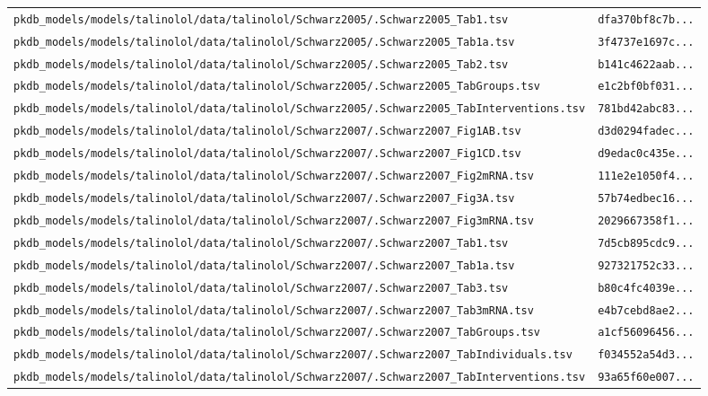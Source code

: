 \documentclass{article}
\begin{document}
\begin{longtable}{ll}
\texttt{pkdb\_models/models/talinolol/data/talinolol/Schwarz2005/.Schwarz2005\_Tab1.tsv} & \texttt{dfa370bf8c7b...} \\
\texttt{pkdb\_models/models/talinolol/data/talinolol/Schwarz2005/.Schwarz2005\_Tab1a.tsv} & \texttt{3f4737e1697c...} \\
\texttt{pkdb\_models/models/talinolol/data/talinolol/Schwarz2005/.Schwarz2005\_Tab2.tsv} & \texttt{b141c4622aab...} \\
\texttt{pkdb\_models/models/talinolol/data/talinolol/Schwarz2005/.Schwarz2005\_TabGroups.tsv} & \texttt{e1c2bf0bf031...} \\
\texttt{pkdb\_models/models/talinolol/data/talinolol/Schwarz2005/.Schwarz2005\_TabInterventions.tsv} & \texttt{781bd42abc83...} \\
\texttt{pkdb\_models/models/talinolol/data/talinolol/Schwarz2007/.Schwarz2007\_Fig1AB.tsv} & \texttt{d3d0294fadec...} \\
\texttt{pkdb\_models/models/talinolol/data/talinolol/Schwarz2007/.Schwarz2007\_Fig1CD.tsv} & \texttt{d9edac0c435e...} \\
\texttt{pkdb\_models/models/talinolol/data/talinolol/Schwarz2007/.Schwarz2007\_Fig2mRNA.tsv} & \texttt{111e2e1050f4...} \\
\texttt{pkdb\_models/models/talinolol/data/talinolol/Schwarz2007/.Schwarz2007\_Fig3A.tsv} & \texttt{57b74edbec16...} \\
\texttt{pkdb\_models/models/talinolol/data/talinolol/Schwarz2007/.Schwarz2007\_Fig3mRNA.tsv} & \texttt{2029667358f1...} \\
\texttt{pkdb\_models/models/talinolol/data/talinolol/Schwarz2007/.Schwarz2007\_Tab1.tsv} & \texttt{7d5cb895cdc9...} \\
\texttt{pkdb\_models/models/talinolol/data/talinolol/Schwarz2007/.Schwarz2007\_Tab1a.tsv} & \texttt{927321752c33...} \\
\texttt{pkdb\_models/models/talinolol/data/talinolol/Schwarz2007/.Schwarz2007\_Tab3.tsv} & \texttt{b80c4fc4039e...} \\
\texttt{pkdb\_models/models/talinolol/data/talinolol/Schwarz2007/.Schwarz2007\_Tab3mRNA.tsv} & \texttt{e4b7cebd8ae2...} \\
\texttt{pkdb\_models/models/talinolol/data/talinolol/Schwarz2007/.Schwarz2007\_TabGroups.tsv} & \texttt{a1cf56096456...} \\
\texttt{pkdb\_models/models/talinolol/data/talinolol/Schwarz2007/.Schwarz2007\_TabIndividuals.tsv} & \texttt{f034552a54d3...} \\
\texttt{pkdb\_models/models/talinolol/data/talinolol/Schwarz2007/.Schwarz2007\_TabInterventions.tsv} & \texttt{93a65f60e007...} \\

\end{longtable}
\end{document}
